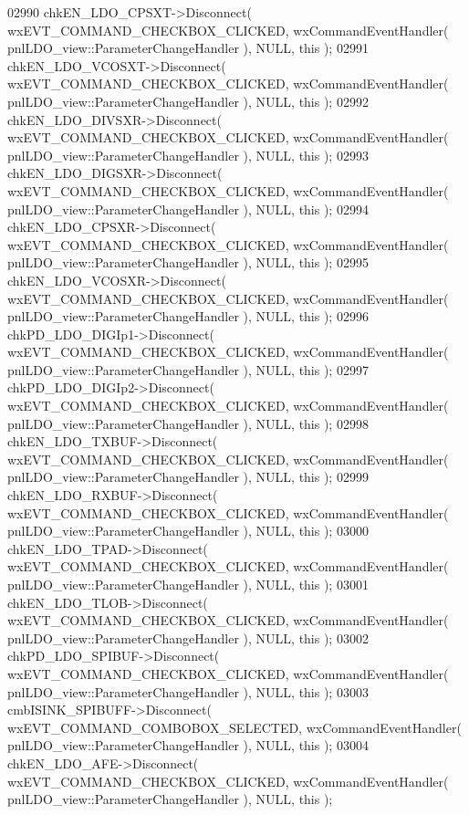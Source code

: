 \begin{DoxyCode}
02990     chkEN_LDO_CPSXT->Disconnect( wxEVT\_COMMAND\_CHECKBOX\_CLICKED, wxCommandEventHandler( 
      pnlLDO_view::ParameterChangeHandler ), NULL, \textcolor{keyword}{this} );
02991     chkEN_LDO_VCOSXT->Disconnect( wxEVT\_COMMAND\_CHECKBOX\_CLICKED, wxCommandEventHandler( 
      pnlLDO_view::ParameterChangeHandler ), NULL, \textcolor{keyword}{this} );
02992     chkEN_LDO_DIVSXR->Disconnect( wxEVT\_COMMAND\_CHECKBOX\_CLICKED, wxCommandEventHandler( 
      pnlLDO_view::ParameterChangeHandler ), NULL, \textcolor{keyword}{this} );
02993     chkEN_LDO_DIGSXR->Disconnect( wxEVT\_COMMAND\_CHECKBOX\_CLICKED, wxCommandEventHandler( 
      pnlLDO_view::ParameterChangeHandler ), NULL, \textcolor{keyword}{this} );
02994     chkEN_LDO_CPSXR->Disconnect( wxEVT\_COMMAND\_CHECKBOX\_CLICKED, wxCommandEventHandler( 
      pnlLDO_view::ParameterChangeHandler ), NULL, \textcolor{keyword}{this} );
02995     chkEN_LDO_VCOSXR->Disconnect( wxEVT\_COMMAND\_CHECKBOX\_CLICKED, wxCommandEventHandler( 
      pnlLDO_view::ParameterChangeHandler ), NULL, \textcolor{keyword}{this} );
02996     chkPD_LDO_DIGIp1->Disconnect( wxEVT\_COMMAND\_CHECKBOX\_CLICKED, wxCommandEventHandler( 
      pnlLDO_view::ParameterChangeHandler ), NULL, \textcolor{keyword}{this} );
02997     chkPD_LDO_DIGIp2->Disconnect( wxEVT\_COMMAND\_CHECKBOX\_CLICKED, wxCommandEventHandler( 
      pnlLDO_view::ParameterChangeHandler ), NULL, \textcolor{keyword}{this} );
02998     chkEN_LDO_TXBUF->Disconnect( wxEVT\_COMMAND\_CHECKBOX\_CLICKED, wxCommandEventHandler( 
      pnlLDO_view::ParameterChangeHandler ), NULL, \textcolor{keyword}{this} );
02999     chkEN_LDO_RXBUF->Disconnect( wxEVT\_COMMAND\_CHECKBOX\_CLICKED, wxCommandEventHandler( 
      pnlLDO_view::ParameterChangeHandler ), NULL, \textcolor{keyword}{this} );
03000     chkEN_LDO_TPAD->Disconnect( wxEVT\_COMMAND\_CHECKBOX\_CLICKED, wxCommandEventHandler( 
      pnlLDO_view::ParameterChangeHandler ), NULL, \textcolor{keyword}{this} );
03001     chkEN_LDO_TLOB->Disconnect( wxEVT\_COMMAND\_CHECKBOX\_CLICKED, wxCommandEventHandler( 
      pnlLDO_view::ParameterChangeHandler ), NULL, \textcolor{keyword}{this} );
03002     chkPD_LDO_SPIBUF->Disconnect( wxEVT\_COMMAND\_CHECKBOX\_CLICKED, wxCommandEventHandler( 
      pnlLDO_view::ParameterChangeHandler ), NULL, \textcolor{keyword}{this} );
03003     cmbISINK_SPIBUFF->Disconnect( wxEVT\_COMMAND\_COMBOBOX\_SELECTED, wxCommandEventHandler( 
      pnlLDO_view::ParameterChangeHandler ), NULL, \textcolor{keyword}{this} );
03004     chkEN_LDO_AFE->Disconnect( wxEVT\_COMMAND\_CHECKBOX\_CLICKED, wxCommandEventHandler( 
      pnlLDO_view::ParameterChangeHandler ), NULL, \textcolor{keyword}{this} );

\end{DoxyCode}
